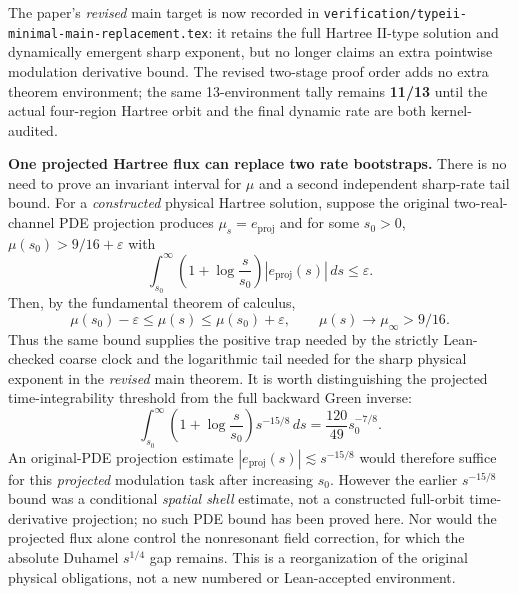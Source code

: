 \documentclass[11pt]{amsart}
\begin{document}
The paper's \emph{revised} main target is now recorded in
\texttt{verification/typeii-minimal-main-replacement.tex}:
it retains the full Hartree II-type solution and dynamically
emergent sharp exponent, but no longer claims an extra
pointwise modulation derivative bound. The revised
two-stage proof order adds no extra theorem environment;
the same 13-environment tally
remains \textbf{11/13} until the actual
four-region Hartree orbit and the final dynamic rate
are both kernel-audited.


\medskip
\noindent\textbf{One projected Hartree flux can replace two rate bootstraps.}
There is no need to prove an invariant interval for \(\mu\) and
a second independent sharp-rate tail bound. For a
\emph{constructed} physical Hartree solution, suppose the original
two-real-channel PDE projection produces
\(\mu_s=e_{\mathrm{proj}}\) and for some \(s_0>0\),
\(\mu(s_0)>9/16+\varepsilon\) with
\[
 \int_{s_0}^\infty
  \left(1+\log\frac{s}{s_0}\right)|e_{\mathrm{proj}}(s)|\,ds
 \le\varepsilon.
\]
Then, by the fundamental theorem of calculus,
\[
 \mu(s_0)-\varepsilon\le\mu(s)\le
 \mu(s_0)+\varepsilon,\qquad
 \mu(s)\longrightarrow\mu_\infty>9/16.
\]
Thus the same bound supplies the positive trap needed by
the strictly Lean-checked coarse clock and the logarithmic
tail needed for the sharp physical exponent in the
\emph{revised} main theorem.
It is worth distinguishing the projected time-integrability
threshold from the full backward Green inverse:
\[
 \int_{s_0}^\infty
  \left(1+\log\frac{s}{s_0}\right)s^{-15/8}\,ds
   =\frac{120}{49}s_0^{-7/8}.
\]
An original-PDE projection estimate
\(|e_{\mathrm{proj}}(s)|\lesssim s^{-15/8}\)
would therefore suffice for this \emph{projected}
modulation task after increasing \(s_0\).
However the earlier \(s^{-15/8}\) bound was a conditional
\emph{spatial shell} estimate, not a constructed full-orbit
time-derivative projection; no such PDE bound has been
proved here. Nor would the projected flux alone control
the nonresonant field correction, for which the absolute
Duhamel \(s^{1/4}\) gap remains.
This is a reorganization of the original physical obligations,
not a new numbered or Lean-accepted environment.
\end{document}
